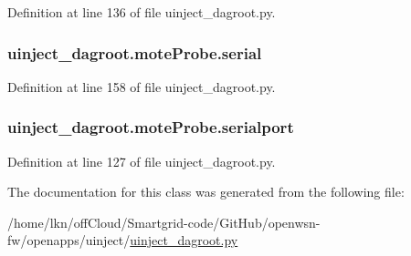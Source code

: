Definition at line 136 of file uinject\+\_\+dagroot.\+py.

\subsubsection[{\texorpdfstring{serial}{serial}}]{\setlength{\rightskip}{0pt plus 5cm}uinject\+\_\+dagroot.\+mote\+Probe.\+serial}\hypertarget{classuinject__dagroot_1_1mote_probe_a838b6c69754953c0941805c5ae00a1af}{}\label{classuinject__dagroot_1_1mote_probe_a838b6c69754953c0941805c5ae00a1af}


Definition at line 158 of file uinject\+\_\+dagroot.\+py.

\subsubsection[{\texorpdfstring{serialport}{serialport}}]{\setlength{\rightskip}{0pt plus 5cm}uinject\+\_\+dagroot.\+mote\+Probe.\+serialport}\hypertarget{classuinject__dagroot_1_1mote_probe_a14b163224b5fac9aa1c93aac7b212256}{}\label{classuinject__dagroot_1_1mote_probe_a14b163224b5fac9aa1c93aac7b212256}


Definition at line 127 of file uinject\+\_\+dagroot.\+py.



The documentation for this class was generated from the following file\+:\begin{DoxyCompactItemize}
\item 
/home/lkn/off\+Cloud/\+Smartgrid-\/code/\+Git\+Hub/openwsn-\/fw/openapps/uinject/\hyperlink{uinject__dagroot_8py}{uinject\+\_\+dagroot.\+py}\end{DoxyCompactItemize}
